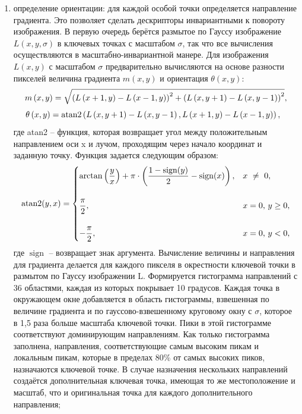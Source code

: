 \documentclass[14pt, a4paper]{extreport}
\begin{document}
\begin{enumerate}[label={\arabic*)}]
		\item определение ориентации: для каждой особой точки определяется направление градиента. Это позволяет сделать дескрипторы инвариантными к повороту изображения. В первую очередь берётся размытое по Гауссу изображение $L\left(x,y,\sigma \right)$ в ключевых точках с масштабом $\sigma$, так что все вычисления осуществляются в масштабно-инвариантной манере. Для изображения $L\left(x,y\right)$ с масштабом $\sigma$  предварительно вычисляются на основе разности пикселей величина градиента $m\left(x,y\right)$ и ориентация $\theta \left(x,y\right)$:
		\begin{equation*}
			m\left(x,y\right)={\sqrt {\left(L\left(x+1,y\right)-L\left(x-1,y\right)\right)^{2}+\left(L\left(x,y+1\right)-L\left(x,y-1\right)\right)^{2}}},
			\label{m(x,y,sigma)}
			\vspace*{-0.4cm}
		\end{equation*}
		\begin{equation*}
			\hspace{-0.25cm}\theta \left(x,y\right)=\mathrm {atan2} \left(L\left(x,y+1\right)-L\left(x,y-1\right),L\left(x+1,y\right)-L\left(x-1,y\right)\right),
			\label{teta(x,y,sigma)}
			\vspace*{-0.35cm}
		\end{equation*}
		где atan2 -- функция, которая возвращает угол между положительным направлением оси x и лучом, проходящим через начало координат и заданную точку.
		Функция задается следующим образом:
		\begin{equation*}
			\operatorname{atan2}(y, x) = 
			\begin{dcases}
				\arctan\left(\frac{y}{x}\right) + \pi \cdot \left( \frac{1 - \operatorname{sign}(y)}{2} - \operatorname{sign}(x) \right), & x~\ne~0, \vspace*{0.4cm} \\ 
				\frac{\pi}{2}, & x=0 \textup{, } y\ge0, 
				\vspace*{0.4cm} \\ 
				-\frac{\pi}{2}, &  x=0 \textup{, } y<0, 
			\end{dcases}
			\label{m(x,y,sigma)}
			\vspace*{-0.1cm}
		\end{equation*}
		где $\operatorname{sign}$ -- возвращает знак аргумента. Вычисление величины и направления для градиента делается для каждого пикселя в окрестности ключевой точки в размытом по Гауссу изображении L. Формируется гистограмма направлений с 36 областями, каждая из которых покрывает 10 градусов. Каждая точка в окружающем окне добавляется в область гистограммы, взвешенная по величине градиента и по гауссово-взвешенному круговому окну с $\sigma$, которое в 1,5 раза больше масштаба ключевой точки. Пики в этой гистограмме соответствуют доминирующим направлениям. Как только гистограмма заполнена, направления, соответствующие самым высоким пикам и локальным пикам, которые в пределах 80\% от самых высоких пиков, назначаются ключевой точке. В случае назначения нескольких направлений создаётся дополнительная ключевая точка, имеющая то же местоположение и масштаб, что и оригинальная точка для каждого дополнительного направления;

\end{enumerate}
\end{document}
